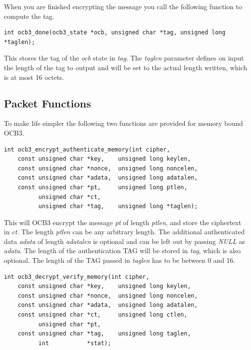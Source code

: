 \documentclass[synpaper]{book}
\begin{document}
When you are finished encrypting the message you call the following function to compute the tag.

\begin{verbatim}
int ocb3_done(ocb3_state *ocb, unsigned char *tag, unsigned long *taglen);
\end{verbatim}

This stores the tag of the \textit{ocb} state in \textit{tag}.
The \textit{taglen} parameter defines on input the length of the tag to output and will be set to the actual length written, which
is at most 16 octets.

\subsection{Packet Functions}
To make life simpler the following two functions are provided for memory bound OCB3.

\begin{verbatim}
int ocb3_encrypt_authenticate_memory(int cipher,
    const unsigned char *key,    unsigned long keylen,
    const unsigned char *nonce,  unsigned long noncelen,
    const unsigned char *adata,  unsigned long adatalen,
    const unsigned char *pt,     unsigned long ptlen,
          unsigned char *ct,
          unsigned char *tag,    unsigned long *taglen);
\end{verbatim}

This will OCB3 encrypt the message \textit{pt} of length \textit{ptlen}, and store the ciphertext in \textit{ct}.  The length \textit{ptlen}
can be any arbitrary length.  The additional authenticated data \textit{adata} of length \textit{adatalen} is optional and can be left out
by passing \textit{NULL} as \textit{adata}. The length of the authentication TAG will be stored in \textit{tag}, which is also optional.
The length of the TAG passed in \textit{taglen} has to be between 0 and 16.

\begin{verbatim}
int ocb3_decrypt_verify_memory(int cipher,
    const unsigned char *key,    unsigned long keylen,
    const unsigned char *nonce,  unsigned long noncelen,
    const unsigned char *adata,  unsigned long adatalen,
    const unsigned char *ct,     unsigned long ctlen,
          unsigned char *pt,
    const unsigned char *tag,    unsigned long taglen,
          int           *stat);
\end{verbatim}
\end{document}
